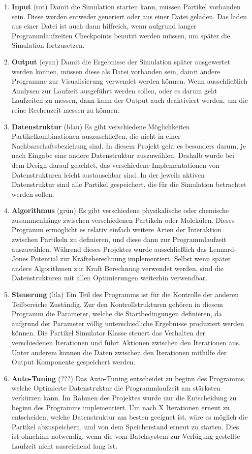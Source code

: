 \documentclass[
	12pt,
	a4paper,
	BCOR10mm,
	DIV14,
	headsepline,
]{scrreprt}
\begin{document}
	\begin{enumerate}
		\item \textbf{Input} (rot) Damit die Simulation starten kann, müssen Partikel vorhanden sein. Diese werden entweder generiert oder aus einer Datei geladen. Das laden aus einer Datei ist auch dann hilfreich, wenn aufgrund langer Programmlaufzeiten Checkpoints benutzt werden müssen, um später die Simulation fortzusetzen.
		\item \textbf{Output} (cyan) Damit die Ergebnisse der Simulation später ausgewertet werden können, müssen diese als Datei vorhanden sein, damit andere Programme zur Visualisierung verwendet werden können. Wenn ausschließlich Analysen zur Laufzeit ausgeführt werden sollen, oder es darum geht Laufzeiten zu messen, dann kann der Output auch deaktiviert werden, um die reine Rechenzeit messen zu können.
		\item \textbf{Datenstruktur} (blau) Es gibt verschiedene Möglichkeiten Partikelkombinationen auszuschließen, die nicht in einer Nachbarschaftsbeziehung sind. In diesem Projekt geht es besonders darum, je nach Eingabe eine andere Datenstruktur auszuwählen. Deshalb wurde bei dem Design darauf geachtet, das verschiedene Implementationen von Datenstrukturen leicht austauschbar sind. In der jeweils aktiven Datenstruktur sind alle Partikel gespeichert, die für die Simulation betrachtet werden sollen.
		\item \textbf{Algorithmus} (grün) Es gibt verschiedene physikalische oder chemische zusammenhänge zwischen verschiedenen Partikeln oder Molekülen. Dieses Programm ermöglicht es relativ einfach weitere Arten der Interaktion zwischen Partikeln zu definieren, und diese dann zur Programmlaufzeit auszuwählen. Während dieses Projektes wurde ausschließlich das Lennard-Jones Potential zur Kräfteberechnung implementiert. Selbst wenn später andere Algorithmen zur Kraft Berechnung verwendet werden, sind die Datenstrukturen mit allen Optimierungen weiterhin verwendbar.
		\item \textbf{Steuerung} (lila) Ein Teil des Programms ist für die Kontrolle der anderen Teilbereiche Zuständig. Zur den Kontrollstrukturen gehören in diesem Programm die Parameter, welche die Startbedingungen definieren, da aufgrund der Parameter völlig unterschiedliche Ergebnisse produziert werden können. Die Partikel Simulator Klasse steuert das Verhalten der verschiedenen Iterationen und führt Aktionen zwischen den Iterationen aus. Unter anderem können die Daten zwischen den Iterationen mithilfe der Output Komponente gespeichert werden.
		\item \textbf{Auto-Tuning} (???) %
		Das Auto-Tuning entscheidet zu beginn des Programms, welche Optimierte Datenstruktur die Programmlaufzeit am stärksten verkürzen kann. Im Rahmen des Projektes wurde nur die Entscheidung zu beginn des Programms implementiert. Um nach X Iterationen erneut zu entscheiden, welche Datenstruktur am besten geeignet ist, wäre es möglich die Partikel abzuspeichern, und von dem Speicherstand erneut zu starten. Dies ist ohnehinn notwendig, wenn die vom Batchsystem zur Verfügung gestellte Laufzeit nicht ausreichend lang ist.
	\end{enumerate}
\end{document}
